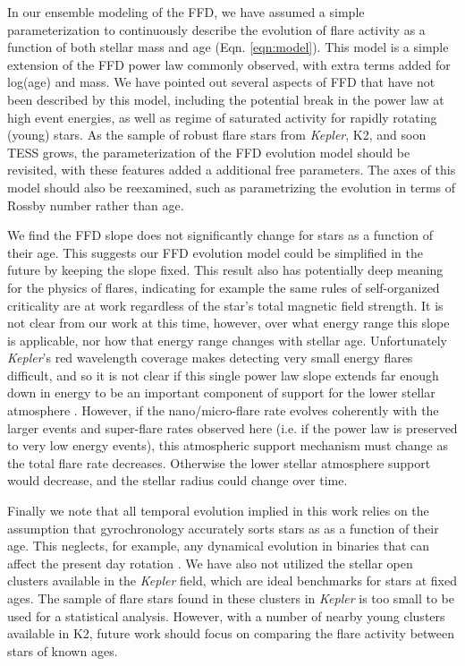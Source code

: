 \documentclass[preprint2]{aastex62}
\newcommand{\Kepler}{\textsl{Kepler}\xspace}
\begin{document}
In our ensemble modeling of the FFD, we have assumed a simple parameterization to continuously describe the evolution of flare activity as a function of both stellar mass and age (Eqn. \ref{eqn:model}). This model is a simple extension of the FFD power law commonly observed, with extra terms added for log(age) and mass. We have pointed out several aspects of FFD that have not been described by this model, including the potential break in the power law at high event energies, as well as regime of saturated activity for rapidly rotating (young) stars. As the sample of robust flare stars from \Kepler, K2, and soon TESS grows, the parameterization of the FFD evolution model should be revisited, with these features added a additional free parameters. The axes of this model should also be reexamined, such as parametrizing the evolution in terms of Rossby number rather than age.

We find the FFD slope does not significantly change for stars as a function of their age. This suggests our FFD evolution model could be simplified in the future by keeping the slope fixed. This result also has potentially deep meaning for the physics of flares, indicating for example the same rules of self-organized criticality are at work regardless of the star's total magnetic field strength. It is not clear from our work at this time, however, over what energy range this slope is applicable, nor how that energy range changes with stellar age. Unfortunately \Kepler's red wavelength coverage makes detecting very small energy flares difficult, and so it is not clear if this single power law slope extends far enough down in energy to be an important component of support for the lower stellar atmosphere \citep[e.g. ``Ellerman Bombs'';][]{hansteen2017}. 
However, if the nano/micro-flare rate evolves coherently with the larger events and super-flare rates observed here (i.e. if the power law is preserved to very low energy events), this atmospheric support mechanism must change as the total flare rate decreases. Otherwise the lower stellar atmosphere support would decrease, and the stellar radius could change over time.

Finally we note that all temporal evolution implied in this work relies on the assumption that gyrochronology accurately sorts stars as as a function of their age. This neglects, for example, any dynamical evolution in binaries that can affect the present day rotation \citep[e.g.][]{lurie2017,clarke2018}. We have also not utilized the stellar open clusters available in the \Kepler field, which are ideal benchmarks for stars at fixed ages. The sample of flare stars found in these clusters in \Kepler is too small to be used for a statistical analysis. However, with a number of nearby young clusters available in K2, future work should focus on comparing the flare activity between stars of known ages.
\end{document}
